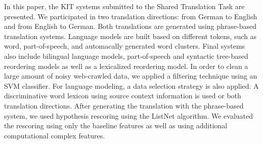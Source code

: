 In this paper, the KIT systems submitted to the Shared Translation Task are presented. We participated in two translation directions: from German to English and from English to German. Both translations are generated using phrase-based translation systems. Language models are built based on different tokens, such as word, part-of-speech, and automacally generated word clusters. Final systems also include bilingual language models, part-of-speech and syntactic tree-based reordering models as well as a lexicalized reordering model. In order to clean a large amount of noisy web-crawled data, we applied a filtering technique using an SVM classifier. For language modeling, a data selection strategy is also applied. A discriminative word lexicon using source context information is used or both translation directions. After generating the translation with the phrase-based system, we used hypothesis rescoring using the ListNet algorithm. We evaluated the rescoring using only the baseline features as well as using additional computational complex features.
